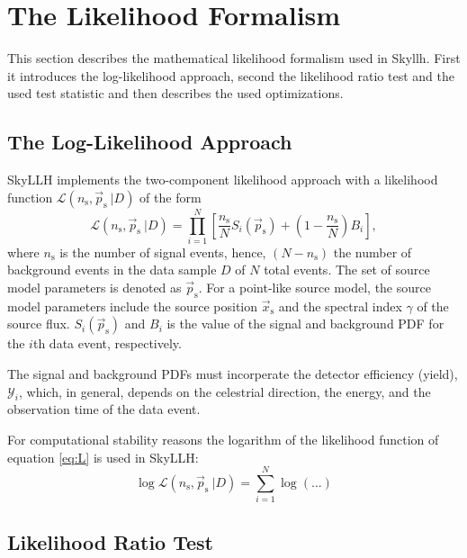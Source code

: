 \documentclass{article}
\newcommand{\ns}{n_{\mathrm{s}}}
\newcommand{\ps}{\vec{p}_{\mathrm{s}}}
\newcommand{\xs}{\vec{x}_{\mathrm{s}}}
\begin{document}
\section{The Likelihood Formalism}

This section describes the mathematical likelihood formalism used in Skyllh.
First it introduces the log-likelihood approach, second the likelihood ratio
test and the used test statistic and then describes the used optimizations.

\subsection{The Log-Likelihood Approach}

SkyLLH implements the two-component likelihood approach with a likelihood
function $\mathcal{L}(n_{\mathrm{s}},\vec{p}_{\mathrm{s}}~|D)$ of the form
\begin{equation}
 \mathcal{L}(\ns,\ps~|D) = \prod_{i=1}^{N}\left[ \frac{\ns}{N} S_{i}(\ps) + (1 - \frac{\ns}{N}) B_{i} \right],
\label{eq:L}
\end{equation}
where $\ns$ is the number of signal events, hence, $(N-\ns)$ the number of
background events in the data sample $D$ of $N$ total events.
The set of source model parameters is denoted as $\ps$. For a point-like source
model, the source model parameters include the source position $\xs$ and the
spectral index $\gamma$ of the source flux.
$S_i(\ps)$ and $B_i$ is the value of the signal and background PDF for the $i$th
data event, respectively.

The signal and background PDFs must incorperate the detector efficiency (yield),
$\mathcal{Y}_i$, which, in general, depends on the celestrial direction, the
energy, and the observation time of the data event.

For computational stability reasons the logarithm of the likelihood function of
equation \ref{eq:L} is used in SkyLLH:
\begin{equation}
 \log \mathcal{L}(\ns,\ps~|D) = \sum_{i=1}^{N} \log (...)
\end{equation}

\subsection{Likelihood Ratio Test}
\end{document}
